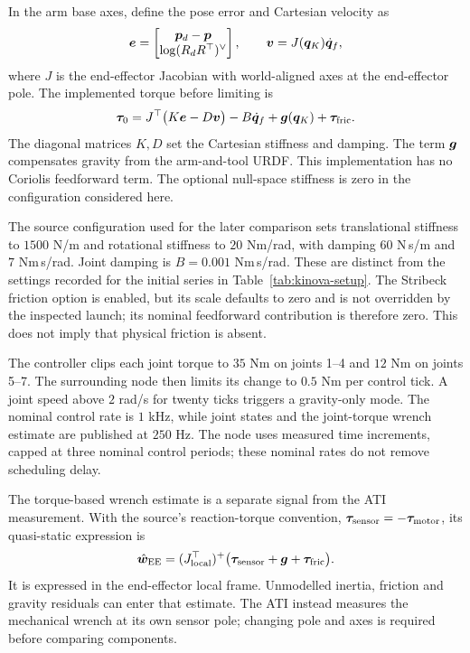 In the arm base axes, define the pose error and Cartesian velocity as
\begin{equation}
\bm{e}=\begin{bmatrix}\bm{p}_d-\bm{p}\\\operatorname{log}(R_dR^\top)^\vee\end{bmatrix},
\qquad \bm{v}=J(\bm{q}_K)\dot{\bm{q}}_f,
\end{equation}
where $J$ is the end-effector Jacobian with world-aligned axes at the end-effector pole. The implemented torque before limiting is
\begin{equation}
\bm{\tau}_0=J^\top\bigl(K\bm{e}-D\bm{v}\bigr)
-B\dot{\bm{q}}_f+\bm{g}(\bm{q}_K)+\bm{\tau}_{\mathrm{fric}}.
\label{eq:kinova-impedance}
\end{equation}
The diagonal matrices $K,D$ set the Cartesian stiffness and damping. The term $\bm{g}$ compensates gravity from the arm-and-tool URDF. This implementation has no Coriolis feedforward term. The optional null-space stiffness is zero in the configuration considered here.

The source configuration used for the later comparison sets translational stiffness to $1500$ N/m and rotational stiffness to $20$ Nm/rad, with damping $60$ N\,s/m and $7$ Nm\,s/rad. Joint damping is $B=0.001$ Nm\,s/rad. These are distinct from the settings recorded for the initial series in Table~\ref{tab:kinova-setup}. The Stribeck friction option is enabled, but its scale defaults to zero and is not overridden by the inspected launch; its nominal feedforward contribution is therefore zero. This does not imply that physical friction is absent.

The controller clips each joint torque to $35$ Nm on joints 1--4 and $12$ Nm on joints 5--7. The surrounding node then limits its change to $0.5$ Nm per control tick. A joint speed above $2$ rad/s for twenty ticks triggers a gravity-only mode. The nominal control rate is $1$ kHz, while joint states and the joint-torque wrench estimate are published at $250$ Hz. The node uses measured time increments, capped at three nominal control periods; these nominal rates do not remove scheduling delay.

The torque-based wrench estimate is a separate signal from the ATI measurement. With the source's reaction-torque convention, $\bm{\tau}_{\mathrm{sensor}}=-\bm{\tau}_{\mathrm{motor}}$, its quasi-static expression is
\begin{equation}
\hat{\bm{w}}_{\mathrm{EE}}=(J_{\mathrm{local}}^\top)^+
\bigl(\bm{\tau}_{\mathrm{sensor}}+\bm{g}+\bm{\tau}_{\mathrm{fric}}\bigr).
\label{eq:kinova-wrench-estimate}
\end{equation}
It is expressed in the end-effector local frame. Unmodelled inertia, friction and gravity residuals can enter that estimate. The ATI instead measures the mechanical wrench at its own sensor pole; changing pole and axes is required before comparing components.

